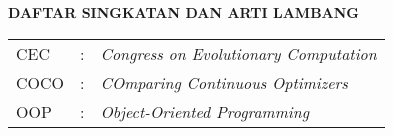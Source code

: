 \clearpage
{}
{}

\begin{center}
    \large \textbf{DAFTAR SINGKATAN DAN ARTI LAMBANG}
\end{center}
\vspace{3em}

\begin{center}
    \begin{table}[htbp]
        \begin{tabular}{l l l}
            CEC            &:& \textit{Congress on Evolutionary Computation} \\ %
            COCO            &:& \textit{COmparing Continuous Optimizers} \\ %
            OOP            &:& \textit{Object-Oriented Programming} \\ %
        \end{tabular}
    \end{table}
\end{center}


